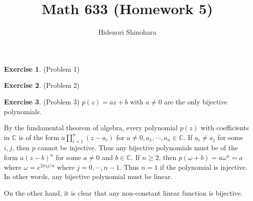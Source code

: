 \documentclass[12pt, psamsfonts]{amsart}
\theoremstyle{definition}
\newtheorem*{exer}{Exercise}
\theoremstyle{remark}
\numberwithin{equation}{section}
\begin{document}
\title{Math 633 (Homework 5)}
\author{Hidenori Shinohara}
\maketitle

\begin{exer}{(Problem 1)}
  \todo[inline,caption={}]{
  }
\end{exer}

\begin{exer}{(Problem 2)}
  \todo[inline,caption={}]{
  }
\end{exer}

\begin{exer}{(Problem 3)}
  $p(z) = az + b$ with $a \ne 0$ are the only bijective polynomials.

  By the fundamental theorem of algebra, every polynomial $p(z)$ with coefficients in $\mathbb{C}$ is of the form $a\prod_{i=1}^{n}(z - a_i)$ for $a \ne 0, a_1, \cdots, a_n \in \mathbb{C}$.
  If $a_i \ne a_j$ for some $i, j$, then $p$ cannot be injective.
  Thus any bijective polynomials must be of the form $a(z - b)^n$ for some $a \ne 0$ and $b \in \mathbb{C}$.
  If $n \geq 2$, then $p(\omega + b) = a\omega^n = a$ where $\omega = e^{2\pi i j / n}$ where $j = 0, \cdots, n - 1$.
  Thus $n = 1$ if the polynomial is injective.
  In other words, any bijective polynomial must be linear.

  On the other hand, it is clear that any non-constant linear function is bijective.
\end{exer}
\end{document}
